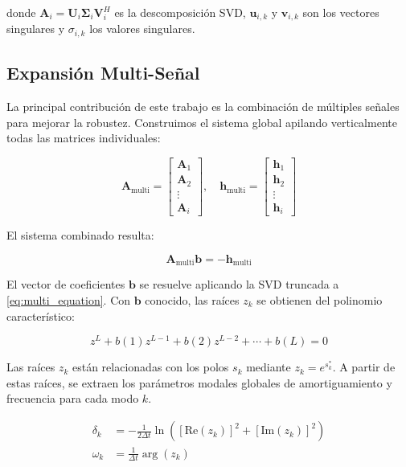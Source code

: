 \documentclass[conference]{IEEEtran}
\begin{document}
donde $\mathbf{A}_i = \mathbf{U}_i \mathbf{\Sigma}_i \mathbf{V}_i^H$ es la descomposición SVD, $\mathbf{u}_{i,k}$ y $\mathbf{v}_{i,k}$ son los vectores singulares y $\sigma_{i,k}$ los valores singulares.

\subsection{Expansión Multi-Señal}

La principal contribución de este trabajo es la combinación de múltiples señales para mejorar la robustez. Construimos el sistema global apilando verticalmente todas las matrices individuales:

\begin{equation}
\mathbf{A}_{\text{multi}} = 
\begin{bmatrix}
\mathbf{A}_1 \\
\mathbf{A}_2 \\
\vdots \\
\mathbf{A}_i
\end{bmatrix}, \quad
\mathbf{h}_{\text{multi}} = 
\begin{bmatrix}
\mathbf{h}_1 \\
\mathbf{h}_2 \\
\vdots \\
\mathbf{h}_i
\end{bmatrix}
\label{eq:multi_system}
\end{equation}

El sistema combinado resulta:

\begin{equation}
\mathbf{A}_{\text{multi}} \mathbf{b} = -\mathbf{h}_{\text{multi}}
\label{eq:multi_equation}
\end{equation}

El vector de coeficientes $\mathbf{b}$ se resuelve aplicando la SVD truncada a \eqref{eq:multi_equation}. Con $\mathbf{b}$ conocido, las raíces $z_k$ se obtienen del polinomio característico:

\begin{equation}
z^L + b(1)z^{L-1} + b(2)z^{L-2} + \cdots + b(L) = 0
\label{eq:characteristic_poly}
\end{equation}

Las raíces $z_k$ están relacionadas con los polos $s_k$ mediante $z_k = e^{s_k^*}$. A partir de estas raíces, se extraen los parámetros modales globales de amortiguamiento y frecuencia para cada modo $k$.

\begin{align}
\delta_k &= -\frac{1}{2\Delta t} \ln\left( [\text{Re}(z_k)]^2 + [\text{Im}(z_k)]^2 \right) \\
\omega_k &= \frac{1}{\Delta t} \arg(z_k)
\label{eq:frequency}
\end{align}
\end{document}
